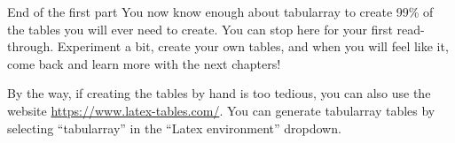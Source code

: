 \vspace*{\fill} %

\begin{infobox}{End of the first part}
	You now know enough about tabularray to create 99\% of the tables you will ever need to create. You can stop here for your first read-through. Experiment a bit, create your own tables, and when you will feel like it, come back and learn more with the next chapters!
	\vspace{1em}
	
	By the way, if creating the tables by hand is too tedious, you can also use the website \url{https://www.latex-tables.com/}. You can generate tabularray tables by selecting ``tabularray'' in the ``Latex environment'' dropdown.
\end{infobox}

\vfill